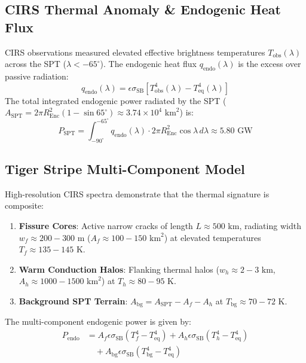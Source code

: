 \documentclass[10pt,twocolumn,a4paper]{article}
\begin{document}
\subsection{CIRS Thermal Anomaly \& Endogenic Heat Flux}
CIRS observations measured elevated effective brightness temperatures $T_{\text{obs}}(\lambda)$ across the SPT ($\lambda < -65^{\circ}$). The endogenic heat flux $q_{\text{endo}}(\lambda)$ is the excess over passive radiation:
\begin{equation}
q_{\text{endo}}(\lambda) = \epsilon \sigma_{\text{SB}} \left[ T_{\text{obs}}^4(\lambda) - T_{\text{eq}}^4(\lambda) \right]
\end{equation}
The total integrated endogenic power radiated by the SPT ($A_{\text{SPT}} = 2\pi R_{\text{Enc}}^2(1 - \sin 65^{\circ}) \approx 3.74 \times 10^4\text{ km}^2$) is:
\begin{equation}
P_{\text{SPT}} = \int_{-90^{\circ}}^{-65^{\circ}} q_{\text{endo}}(\lambda) \cdot 2\pi R_{\text{Enc}}^2 \cos\lambda\, d\lambda \approx 5.80\text{ GW}
\end{equation}

\subsection{Tiger Stripe Multi-Component Model}
High-resolution CIRS spectra demonstrate that the thermal signature is composite:
\begin{enumerate}
    \item \textbf{Fissure Cores}: Active narrow cracks of length $L \approx 500\text{ km}$, radiating width $w_f \approx 200-300\text{ m}$ ($A_f \approx 100-150\text{ km}^2$) at elevated temperatures $T_f \approx 135-145\text{ K}$.
    \item \textbf{Warm Conduction Halos}: Flanking thermal halos ($w_h \approx 2-3\text{ km}$, $A_h \approx 1000-1500\text{ km}^2$) at $T_h \approx 80-95\text{ K}$.
    \item \textbf{Background SPT Terrain}: $A_{\text{bg}} = A_{\text{SPT}} - A_f - A_h$ at $T_{\text{bg}} \approx 70-72\text{ K}$.
\end{enumerate}
The multi-component endogenic power is given by:
\begin{align}
P_{\text{endo}} &= A_f \epsilon \sigma_{\text{SB}} (T_f^4 - T_{\text{eq}}^4) + A_h \epsilon \sigma_{\text{SB}} (T_h^4 - T_{\text{eq}}^4) \nonumber \\
&\quad + A_{\text{bg}} \epsilon \sigma_{\text{SB}} (T_{\text{bg}}^4 - T_{\text{eq}}^4)
\end{align}
\end{document}
